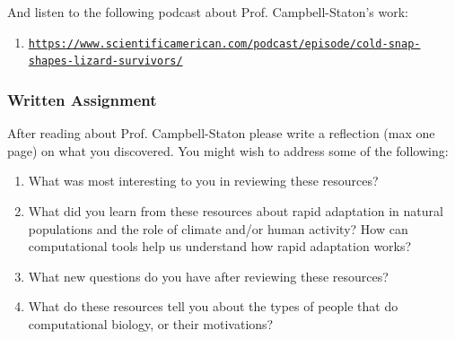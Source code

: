 \documentclass{article}
\begin{document}
And listen to the following podcast about Prof. Campbell-Staton's work:
\begin{enumerate}
\item \texttt{\href{https://www.scientificamerican.com/podcast/episode/cold-snap-shapes-lizard-survivors/}{https://www.scientificamerican.com/podcast/episode/cold-snap-shapes-lizard-survivors/}}
\end{enumerate}

\subsubsection*{Written Assignment} 
After reading about Prof. Campbell-Staton please write a reflection (max one page) on what you discovered. You might wish to address some of the following: 

\begin{enumerate}
\item What was most interesting to you in reviewing these resources?
\item What did you learn from these resources about rapid adaptation in natural populations and the role of climate and/or human activity? How can computational tools help us understand how rapid adaptation works?
\item What new questions do you have after reviewing these resources?
\item What do these resources tell you about the types of people that do computational biology, or their motivations?
\end{enumerate}

\EndAccSupp{}
\end{document}
